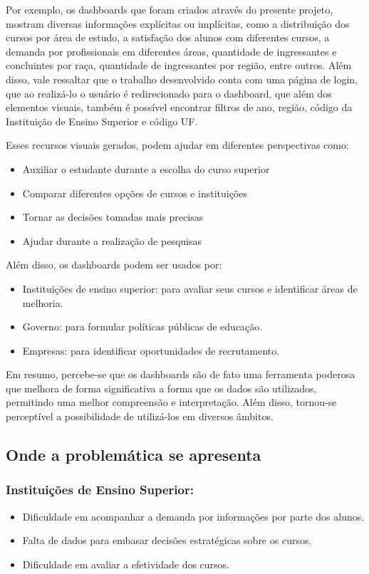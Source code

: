 \documentclass[a4paper,12pt]{article}
\begin{document}
Por exemplo, os dashboards que foram criados através do presente projeto, mostram diversas informações explícitas ou implícitas, como a distribuição dos cursos por área de estudo, a satisfação dos alunos com diferentes cursos, a demanda por profissionais em diferentes áreas, quantidade de ingressantes e concluintes por raça, quantidade de ingressantes por região, entre outros. Além disso, vale ressaltar que o trabalho desenvolvido conta com uma página de login, que ao realizá-lo o usuário é redirecionado para o dashboard, que além dos elementos visuais, também é possível encontrar filtros de ano, região, código da Instituição de Ensino Superior e código UF.

Esses recursos visuais gerados, podem ajudar em diferentes perspectivas como:
\begin{itemize}
    \item Auxiliar o estudante durante a escolha do curso superior
    \item Comparar diferentes opções de cursos e instituições
    \item Tornar as decisões tomadas mais precisas
    \item Ajudar durante a realização de pesquisas
\end{itemize}

Além disso, os dashboards podem ser usados por:
\begin{itemize}
    \item Instituições de ensino superior: para avaliar seus cursos e identificar áreas de melhoria.
    \item Governo: para formular políticas públicas de educação.
    \item Empresas: para identificar oportunidades de recrutamento.
\end{itemize}

Em resumo, percebe-se que os dashboards são de fato uma ferramenta poderosa que melhora de forma significativa a forma que os dados são utilizados, permitindo uma melhor compreensão e interpretação. Além disso, tornou-se perceptível a possibilidade de utilizá-los em diversos âmbitos.

\subsection{Onde a problemática se apresenta}
\subsubsection{Instituições de Ensino Superior:}
\begin{itemize}
    \item Dificuldade em acompanhar a demanda por informações por parte dos alunos.
    \item Falta de dados para embasar decisões estratégicas sobre os cursos.
    \item Dificuldade em avaliar a efetividade dos cursos.
\end{itemize}
\end{document}
